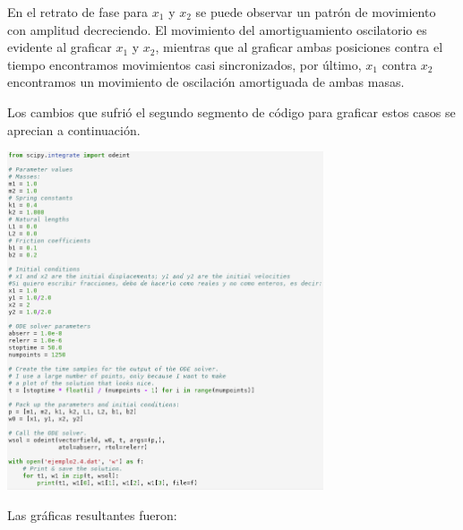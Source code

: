 \documentclass{article}
\begin{document}
En el retrato de fase para $x_1$ y $x_2$ se puede observar un patrón de movimiento con amplitud decreciendo. El movimiento del amortiguamiento oscilatorio es evidente al graficar  $x_1$ y $x_2$, mientras que al graficar ambas posiciones contra el tiempo encontramos movimientos casi sincronizados, por último, $x_1$ contra $x_2$ encontramos un movimiento de oscilación amortiguada de ambas masas. 

Los cambios que sufrió el segundo segmento de código para graficar estos casos se aprecian a continuación.

\begin{center}
\includegraphics[height=10cm]{point24.png}
\end{center}

Las gráficas resultantes fueron:
\end{document}
